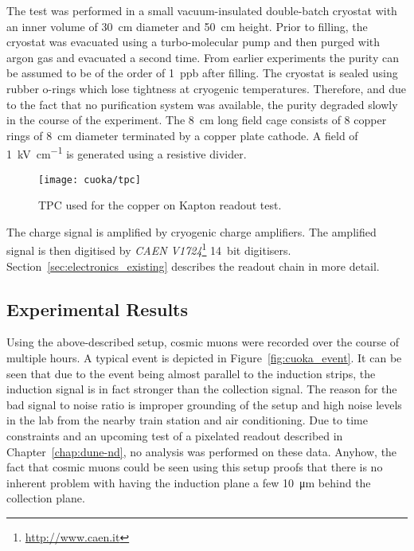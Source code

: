 The test was performed in a small vacuum-insulated double-batch cryostat with an inner volume of \SI{30}{\centi\metre} diameter and \SI{50}{\centi\metre} height.
Prior to filling, the cryostat was evacuated using a turbo-molecular pump and then purged with argon gas and evacuated a second time.
From earlier experiments the purity can be assumed to be of the order of \SI{1}{ppb} after filling.
The cryostat is sealed using rubber o-rings which lose tightness at cryogenic temperatures.
Therefore, and due to the fact that no purification system was available, the purity degraded slowly in the course of the experiment.
The \SI{8}{\centi\metre} long field cage consists of \num{8} copper rings of \SI{8}{\centi\metre} diameter terminated by a copper plate cathode.
A field of \SI{1}{\kilo\volt\per\centi\metre} is generated using a resistive divider.

\begin{figure}[htb]
	\centering
	\texttt{[image: cuoka/tpc]}
	\caption{TPC used for the copper on Kapton readout test.}
	\label{fig:cuoka_tpc}
\end{figure}

The charge signal is amplified by cryogenic charge amplifiers.
The amplified signal is then digitised by \emph{CAEN V1724}\footnote{\url{http://www.caen.it}} \SI{14}{bit} digitisers.
Section~\ref{sec:electronics_existing} describes the readout chain in more detail.


\subsection*{Experimental Results}

Using the above-described setup, cosmic muons were recorded over the course of multiple hours.
A typical event is depicted in Figure~\ref{fig:cuoka_event}.
It can be seen that due to the event being almost parallel to the induction strips, the induction signal is in fact stronger than the collection signal.
The reason for the bad signal to noise ratio is improper grounding of the setup and high noise levels in the lab from the nearby train station and air conditioning.
Due to time constraints and an upcoming test of a pixelated readout described in Chapter~\ref{chap:dune-nd}, no analysis was performed on these data.
Anyhow, the fact that cosmic muons could be seen using this setup proofs that there is no inherent problem with having the induction plane a few \SI{10}{\micro\metre} behind the collection plane.

